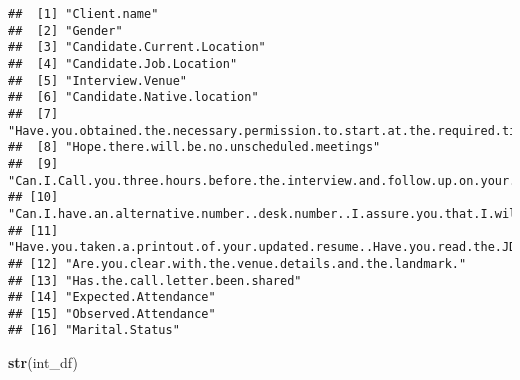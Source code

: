 \documentclass[]{article}
\newenvironment{Shaded}{\begin{snugshade}}{\end{snugshade}}
\newcommand{\KeywordTok}[1]{\textcolor[rgb]{0.13,0.29,0.53}{\textbf{#1}}}
\newcommand{\NormalTok}[1]{#1}
\begin{document}
\begin{verbatim}
##  [1] "Client.name"                                                                                       
##  [2] "Gender"                                                                                            
##  [3] "Candidate.Current.Location"                                                                        
##  [4] "Candidate.Job.Location"                                                                            
##  [5] "Interview.Venue"                                                                                   
##  [6] "Candidate.Native.location"                                                                         
##  [7] "Have.you.obtained.the.necessary.permission.to.start.at.the.required.time"                          
##  [8] "Hope.there.will.be.no.unscheduled.meetings"                                                        
##  [9] "Can.I.Call.you.three.hours.before.the.interview.and.follow.up.on.your.attendance.for.the.interview"
## [10] "Can.I.have.an.alternative.number..desk.number..I.assure.you.that.I.will.not.trouble.you.too.much"  
## [11] "Have.you.taken.a.printout.of.your.updated.resume..Have.you.read.the.JD.and.understood.the.same"    
## [12] "Are.you.clear.with.the.venue.details.and.the.landmark."                                            
## [13] "Has.the.call.letter.been.shared"                                                                   
## [14] "Expected.Attendance"                                                                               
## [15] "Observed.Attendance"                                                                               
## [16] "Marital.Status"
\end{verbatim}

\begin{Shaded}
\begin{Highlighting}[]
\KeywordTok{str}\NormalTok{(int_df)}
\end{Highlighting}
\end{Shaded}
\end{document}

